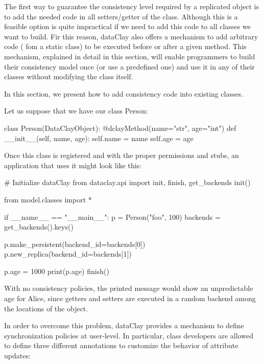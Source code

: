 The first way to guarantee the consistency level required by a replicated object is to add the needed code in all setters/getter of the class. Although this is a feasible option is quite impractical if we need to add this code to all classes we want to build. Fir this reason, dataClay also offers a mechanism to add arbitrary code ( fom a static class) to be executed before or after a given method. This mechanism, explained in detail in this section, will enable programmers to build their consistency model once (or use a predefined one) and use it in any of their classes without modifying the class itself.

In this section, we present how to add consistency code into existing classes.

Let us suppose that we have our class Person:

\begin{tBox}
\begin{python}
class Person(DataClayObject):
    @dclayMethod(name="str", age="int")
    def __init__(self, name, age):
        self.name = name
        self.age = age
\end{python}
\end{tBox}

Once this class is registered and with the proper permissions and stubs, an application that uses it might look like this:

\begin{tBox}
\begin{python}
# Initialize dataClay
from dataclay.api import init, finish, get_backends
init()

from model.classes import *

if __name__ == "__main__":
    p = Person("foo", 100)
    backends = get_backends().keys()
    
    p.make_persistent(backend_id=backends[0])
    p.new_replica(backend_id=backends[1])    
    
    p.age = 1000
    print(p.age)    
    finish()
\end{python}
\end{tBox}

With no consistency policies, the printed message would show an unpredictable age for Alice, since getters and setters are executed in a random backend among the locations of the object.

In order to overcome this problem, dataClay provides a mechanism to define synchronization policies at user-level. In particular, class developers are allowed to define three different annotations to customize the behavior of attribute updates:

